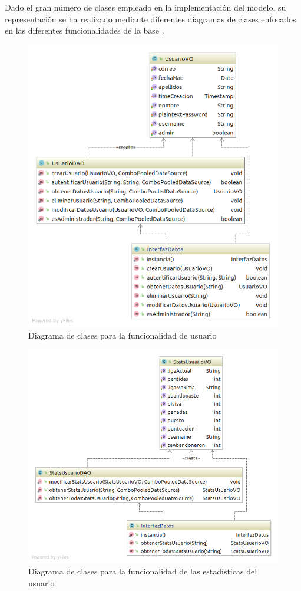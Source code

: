 Dado el gran número de clases empleado en la implementación del modelo, su representación se ha realizado mediante diferentes diagramas de clases enfocados en las diferentes funcionalidades de la base .
\begin{figure}[H]
\centering
\includegraphics[scale = 0.5]{figuras/base_datos/clasesUsuario.png}
\caption{Diagrama de clases para la funcionalidad de usuario}
\label{fig:diagramaClasesUsuario}
\end{figure}
\begin{figure}[H]
\centering
\includegraphics[scale = 0.5]{figuras/base_datos/clasesStats.png}
\caption{Diagrama de clases para la funcionalidad de las estadísticas del usuario}
\label{fig:diagramaClasesStats}
\end{figure}
